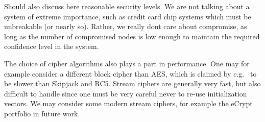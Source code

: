 Should also discuss here reasonable security levels. We are not talking about a system of extreme importance, such as credit card chip systems which must be unbreakable (or nearly so). Rather, we really dont care about compromise, as long as the number of compromised nodes is low enough to maintain the required confidence level in the system.

The choice of cipher algorithms also plays a part in performance. One may for example consider a different block cipher than AES, which is claimed by e.g.\  to be slower than Skipjack and RC5. Stream ciphers are generally very fast, but also difficult to handle since one must be very careful never to re-use initialization vectors. We may consider some modern stream ciphers, for example the eCrypt portfolio in future work.